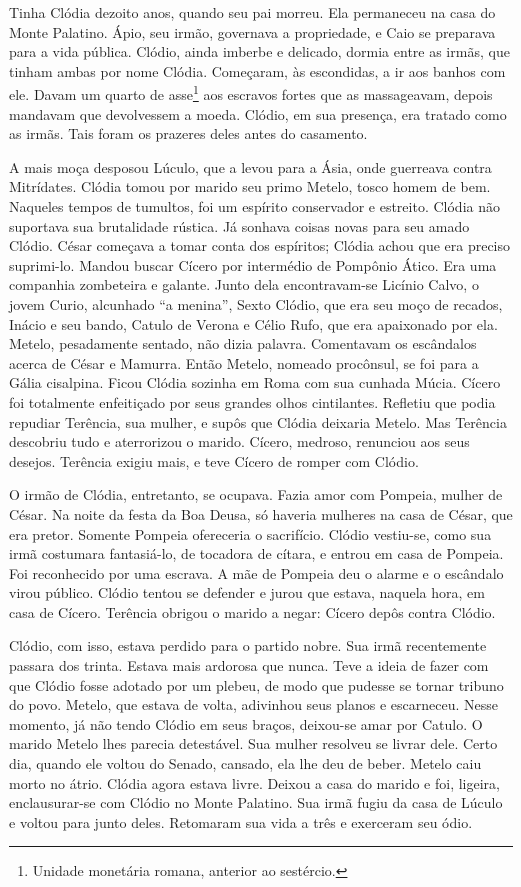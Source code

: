 Tinha Clódia dezoito anos, quando seu pai morreu. Ela permaneceu na casa do
Monte Palatino. Ápio, seu irmão, governava a propriedade, e Caio se
preparava para a vida pública. Clódio, ainda imberbe e delicado, dormia
entre as irmãs, que tinham ambas por nome Clódia. Começaram, às
escondidas, a ir aos banhos com ele. Davam um quarto de asse\footnote{
Unidade monetária romana, anterior ao sestércio.} aos escravos
fortes que as massageavam, depois mandavam que devolvessem a moeda.
Clódio, em sua presença, era tratado como as irmãs. Tais foram os prazeres
deles antes do casamento.

A mais moça desposou Lúculo, que a levou para a Ásia, onde guerreava contra
Mitrídates. Clódia tomou por marido seu primo Metelo, tosco homem de bem.
Naqueles tempos de tumultos, foi um espírito conservador e estreito.
Clódia não suportava sua brutalidade rústica. Já sonhava coisas novas para
seu amado Clódio. César começava a tomar conta dos espíritos; Clódia achou
que era preciso suprimi-lo. Mandou buscar Cícero por intermédio de
Pompônio Ático. Era uma companhia zombeteira e galante. Junto dela
encontravam-se Licínio Calvo, o jovem Curio, alcunhado “a menina”, Sexto
Clódio, que era seu moço de recados, Inácio e seu bando, Catulo de Verona
e Célio Rufo, que era apaixonado por ela. Metelo, pesadamente sentado, não
dizia palavra. Comentavam os escândalos acerca de César e Mamurra. Então
Metelo, nomeado procônsul, se foi para a Gália cisalpina. Ficou Clódia
sozinha em Roma com sua cunhada Múcia. Cícero foi totalmente enfeitiçado
por seus grandes olhos cintilantes. Refletiu que podia repudiar Terência,
sua mulher, e supôs que Clódia deixaria Metelo. Mas Terência descobriu
tudo e aterrorizou o marido. Cícero, medroso, renunciou aos seus desejos.
Terência exigiu mais, e teve Cícero de romper com Clódio.

O irmão de Clódia, entretanto, se ocupava. Fazia amor com Pompeia, mulher   \EP[1]%
de César. Na noite da festa da Boa Deusa, só haveria mulheres na casa de
César, que era pretor. Somente Pompeia ofereceria o sacrifício. Clódio
vestiu-se, como sua irmã costumara fantasiá-lo, de tocadora de cítara, e
entrou em casa de Pompeia. Foi reconhecido por uma escrava. A mãe de
Pompeia deu o alarme e o escândalo virou público. Clódio tentou se
defender e jurou que estava, naquela hora, em casa de Cícero. Terência
obrigou o marido a negar: Cícero depôs contra Clódio.

Clódio, com isso, estava perdido para o partido nobre. Sua irmã
recentemente passara dos trinta. Estava mais ardorosa que nunca. Teve a
ideia de fazer com que Clódio fosse adotado por um plebeu, de modo que
pudesse se tornar tribuno do povo. Metelo, que estava de volta, adivinhou
seus planos e escarneceu. Nesse momento, já não tendo Clódio em seus
braços, deixou-se amar por Catulo. O marido Metelo lhes parecia
detestável. Sua mulher resolveu se livrar dele. Certo dia, quando ele
voltou do Senado, cansado, ela lhe deu de beber. Metelo caiu morto no
átrio. Clódia agora estava livre. Deixou a casa do marido e foi, ligeira,
enclausurar-se com Clódio no Monte Palatino. Sua irmã fugiu da casa de
Lúculo e voltou para junto deles. Retomaram sua vida a três e exerceram
seu ódio.

